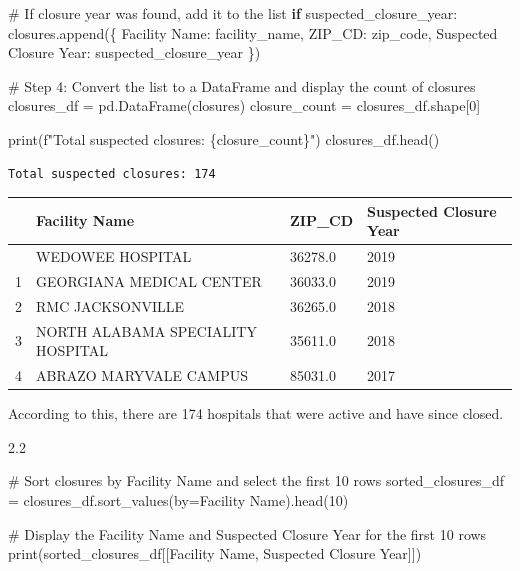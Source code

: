 \documentclass[
  letterpaper,
  DIV=11,
  numbers=noendperiod]{scrartcl}
\newenvironment{Shaded}{\begin{snugshade}}{\end{snugshade}}
\newcommand{\BuiltInTok}[1]{\textcolor[rgb]{0.00,0.23,0.31}{#1}}
\newcommand{\CommentTok}[1]{\textcolor[rgb]{0.37,0.37,0.37}{#1}}
\newcommand{\ControlFlowTok}[1]{\textcolor[rgb]{0.00,0.23,0.31}{\textbf{#1}}}
\newcommand{\DecValTok}[1]{\textcolor[rgb]{0.68,0.00,0.00}{#1}}
\newcommand{\NormalTok}[1]{\textcolor[rgb]{0.00,0.23,0.31}{#1}}
\newcommand{\OperatorTok}[1]{\textcolor[rgb]{0.37,0.37,0.37}{#1}}
\newcommand{\SpecialCharTok}[1]{\textcolor[rgb]{0.37,0.37,0.37}{#1}}
\newcommand{\SpecialStringTok}[1]{\textcolor[rgb]{0.13,0.47,0.30}{#1}}
\newcommand{\StringTok}[1]{\textcolor[rgb]{0.13,0.47,0.30}{#1}}
\begin{document}
\begin{Shaded}
\begin{Highlighting}[]
    \CommentTok{\# If closure year was found, add it to the list}
    \ControlFlowTok{if}\NormalTok{ suspected\_closure\_year:}
\NormalTok{        closures.append(\{}
            \StringTok{\textquotesingle{}Facility Name\textquotesingle{}}\NormalTok{: facility\_name,}
            \StringTok{\textquotesingle{}ZIP\_CD\textquotesingle{}}\NormalTok{: zip\_code,}
            \StringTok{\textquotesingle{}Suspected Closure Year\textquotesingle{}}\NormalTok{: suspected\_closure\_year}
\NormalTok{        \})}

\CommentTok{\# Step 4: Convert the list to a DataFrame and display the count of closures}
\NormalTok{closures\_df }\OperatorTok{=}\NormalTok{ pd.DataFrame(closures)}
\NormalTok{closure\_count }\OperatorTok{=}\NormalTok{ closures\_df.shape[}\DecValTok{0}\NormalTok{]}

\BuiltInTok{print}\NormalTok{(}\SpecialStringTok{f"Total suspected closures: }\SpecialCharTok{\{}\NormalTok{closure\_count}\SpecialCharTok{\}}\SpecialStringTok{"}\NormalTok{)}
\NormalTok{closures\_df.head()}
\end{Highlighting}
\end{Shaded}

\begin{verbatim}
Total suspected closures: 174
\end{verbatim}

\begin{longtable}[]{@{}llll@{}}
\toprule\noalign{}
& Facility Name & ZIP\_CD & Suspected Closure Year \\
\midrule\noalign{}
\endhead
\bottomrule\noalign{}
\endlastfoot
0 & WEDOWEE HOSPITAL & 36278.0 & 2019 \\
1 & GEORGIANA MEDICAL CENTER & 36033.0 & 2019 \\
2 & RMC JACKSONVILLE & 36265.0 & 2018 \\
3 & NORTH ALABAMA SPECIALITY HOSPITAL & 35611.0 & 2018 \\
4 & ABRAZO MARYVALE CAMPUS & 85031.0 & 2017 \\
\end{longtable}

According to this, there are 174 hospitals that were active and have
since closed.

2.2

\begin{Shaded}
\begin{Highlighting}[]
\CommentTok{\# Sort closures by Facility Name and select the first 10 rows}
\NormalTok{sorted\_closures\_df }\OperatorTok{=}\NormalTok{ closures\_df.sort\_values(by}\OperatorTok{=}\StringTok{\textquotesingle{}Facility Name\textquotesingle{}}\NormalTok{).head(}\DecValTok{10}\NormalTok{)}

\CommentTok{\# Display the Facility Name and Suspected Closure Year for the first 10 rows}
\BuiltInTok{print}\NormalTok{(sorted\_closures\_df[[}\StringTok{\textquotesingle{}Facility Name\textquotesingle{}}\NormalTok{, }\StringTok{\textquotesingle{}Suspected Closure Year\textquotesingle{}}\NormalTok{]])}
\end{Highlighting}
\end{Shaded}
\end{document}
